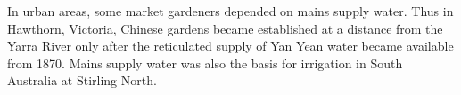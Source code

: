 In urban areas, some market gardeners depended on mains supply water.
Thus in Haw\-th\-orn, Victoria, Chinese gardens became established at
a distance from the Yarra River only after the reticulated supply of
Yan Yean water became available from 1870.  Mains supply water was
also the basis for irrigation in South Australia at Stirling
North.

